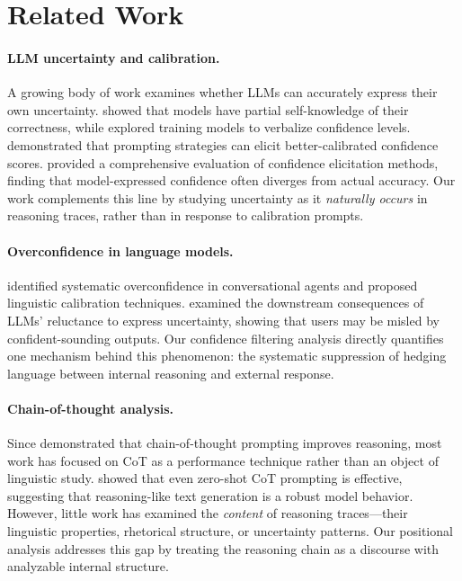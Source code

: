\section{Related Work}

\paragraph{LLM uncertainty and calibration.}
A growing body of work examines whether LLMs can accurately express their own uncertainty. \citet{kadavath2022language} showed that models have partial self-knowledge of their correctness, while \citet{lin2022teaching} explored training models to verbalize confidence levels. \citet{tian2023just} demonstrated that prompting strategies can elicit better-calibrated confidence scores. \citet{xiong2024llms} provided a comprehensive evaluation of confidence elicitation methods, finding that model-expressed confidence often diverges from actual accuracy. Our work complements this line by studying uncertainty as it \emph{naturally occurs} in reasoning traces, rather than in response to calibration prompts.

\paragraph{Overconfidence in language models.}
\citet{mielke2022reducing} identified systematic overconfidence in conversational agents and proposed linguistic calibration techniques. \citet{zhou2024relying} examined the downstream consequences of LLMs' reluctance to express uncertainty, showing that users may be misled by confident-sounding outputs. Our confidence filtering analysis directly quantifies one mechanism behind this phenomenon: the systematic suppression of hedging language between internal reasoning and external response.

\paragraph{Chain-of-thought analysis.}
Since \citet{wei2022chain} demonstrated that chain-of-thought prompting improves reasoning, most work has focused on CoT as a performance technique rather than an object of linguistic study. \citet{kojima2022large} showed that even zero-shot CoT prompting is effective, suggesting that reasoning-like text generation is a robust model behavior. However, little work has examined the \emph{content} of reasoning traces---their linguistic properties, rhetorical structure, or uncertainty patterns. Our positional analysis addresses this gap by treating the reasoning chain as a discourse with analyzable internal structure.

